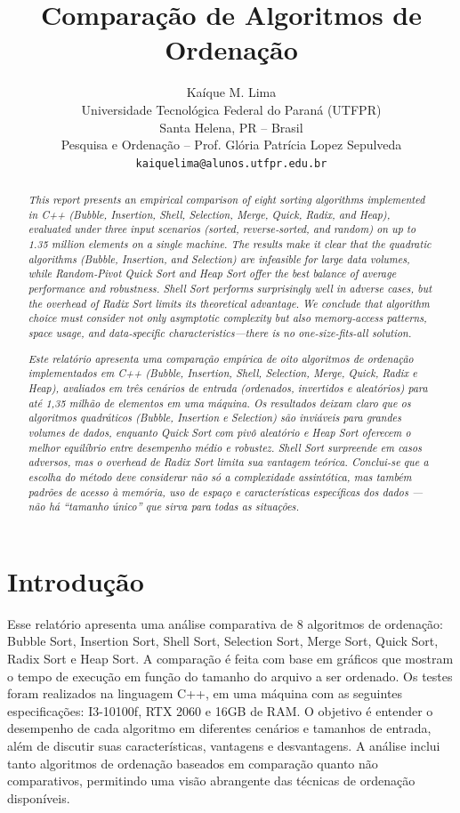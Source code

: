 \documentclass[a4paper, 12pt]{article}
\title{\bf Comparação de Algoritmos de Ordenação}
\author{%
    Kaíque M. Lima \\
    Universidade Tecnológica Federal do Paraná (UTFPR) \\
    Santa Helena, PR -- Brasil\\[1ex]
    Pesquisa e Ordenação -- Prof. Glória Patrícia Lopez Sepulveda\\
    {\small \texttt{kaiquelima@alunos.utfpr.edu.br}}
}
\date{}  %
\begin{document}
\maketitle

\begin{abstract}
    \textit{This report presents an empirical comparison of eight sorting algorithms implemented in C++ (Bubble, Insertion, Shell, Selection, Merge, Quick, Radix, and Heap), evaluated under three input scenarios (sorted, reverse‐sorted, and random) on up to 1.35 million elements on a single machine. The results make it clear that the quadratic algorithms (Bubble, Insertion, and Selection) are infeasible for large data volumes, while Random‐Pivot Quick Sort and Heap Sort offer the best balance of average performance and robustness. Shell Sort performs surprisingly well in adverse cases, but the overhead of Radix Sort limits its theoretical advantage. We conclude that algorithm choice must consider not only asymptotic complexity but also memory‐access patterns, space usage, and data‐specific characteristics—there is no one-size-fits-all solution.
    }
\end{abstract}

\begin{abstract}
    \textit{Este relatório apresenta uma comparação empírica de oito algoritmos de ordenação implementados em C++ (Bubble, Insertion, Shell, Selection, Merge, Quick, Radix e Heap), avaliados em três cenários de entrada (ordenados, invertidos e aleatórios) para até 1,35 milhão de elementos em uma máquina. Os resultados deixam claro que os algoritmos quadráticos (Bubble, Insertion e Selection) são inviáveis para grandes volumes de dados, enquanto Quick Sort com pivô aleatório e Heap Sort oferecem o melhor equilíbrio entre desempenho médio e robustez. Shell Sort surpreende em casos adversos, mas o overhead de Radix Sort limita sua vantagem teórica. Conclui-se que a escolha do método deve considerar não só a complexidade assintótica, mas também padrões de acesso à memória, uso de espaço e características específicas dos dados — não há “tamanho único” que sirva para todas as situações.}
\end{abstract}

\section{Introdução}

    Esse relatório apresenta uma análise comparativa de 8 algoritmos de ordenação: Bubble Sort, Insertion Sort, Shell Sort, Selection Sort, Merge Sort, Quick Sort, Radix Sort e Heap Sort. A comparação é feita com base em gráficos que mostram o tempo de execução em função do tamanho do arquivo a ser ordenado. Os testes foram realizados na linguagem C++, em uma máquina com as seguintes especificações: I3-10100f, RTX 2060 e 16GB de RAM.
    O objetivo é entender o desempenho de cada algoritmo em diferentes cenários e tamanhos de entrada, além de discutir suas características, vantagens e desvantagens. A análise inclui tanto algoritmos de ordenação baseados em comparação quanto não comparativos, permitindo uma visão abrangente das técnicas de ordenação disponíveis.
\end{document}
